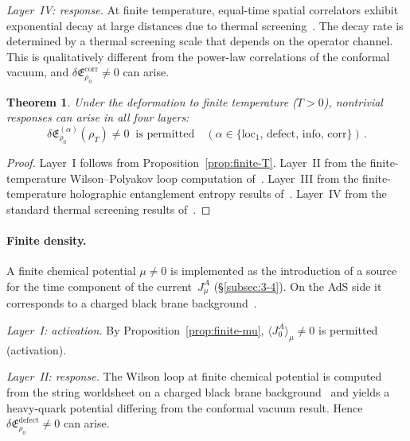 \documentclass[
  aps,
  prd,
  preprint,
  groupedaddress,
  nofootinbib,
  longbibliography
]{revtex4-2}
\newtheorem{theorem}[definition]{Theorem}
\theoremstyle{remark}
\begin{document}
\emph{Layer~IV: response.}
At finite temperature, equal-time spatial correlators exhibit
exponential decay at large distances due to thermal
screening~\cite{ref39,ref46}.
The decay rate is determined by a thermal screening scale that
depends on the operator channel.
This is qualitatively different from the power-law correlations
of the conformal vacuum, and
$\delta\mathfrak{E}_{\rho_0}^{\mathrm{corr}}\neq 0$
can arise.

\begin{theorem}\label{thm:finiteT-layers}
Under the deformation to finite temperature ($T>0$), nontrivial
responses can arise in all four layers:
\begin{equation}\label{eq:finiteT-response}
  \delta\mathfrak{E}_{\rho_0}^{(\alpha)}(\rho_T)\neq 0
  \;\;\text{is permitted}
  \quad
  (\alpha\in\{\mathrm{loc}_1,\,\mathrm{defect},\,
    \mathrm{info},\,\mathrm{corr}\})\,.
\end{equation}
\end{theorem}

\begin{proof}
Layer~I follows from
Proposition~\ref{prop:finite-T}.
Layer~II from the finite-temperature Wilson--Polyakov loop
computation of~\cite{ref40}.
Layer~III from the finite-temperature holographic entanglement
entropy results of~\cite{ref42}.
Layer~IV from the standard thermal screening results
of~\cite{ref39}.
\end{proof}

\paragraph{Finite density.}
A finite chemical potential $\mu\neq 0$ is implemented as the
introduction of a source for the time component of the
current~$J_\mu^A$ (\S\ref{subsec:3-4}).
On the AdS side it corresponds to a charged black brane
background~\cite{ref9,ref10,ref11}.

\emph{Layer~I: activation.}
By Proposition~\ref{prop:finite-mu},
$\langle J_0^A\rangle_\mu\neq 0$ is permitted (activation).

\emph{Layer~II: response.}
The Wilson loop at finite chemical potential is computed from
the string worldsheet on a charged black brane
background~\cite{ref44} and yields a heavy-quark potential
differing from the conformal vacuum result.
Hence
$\delta\mathfrak{E}_{\rho_0}^{\mathrm{defect}}\neq 0$
can arise.
\end{document}
